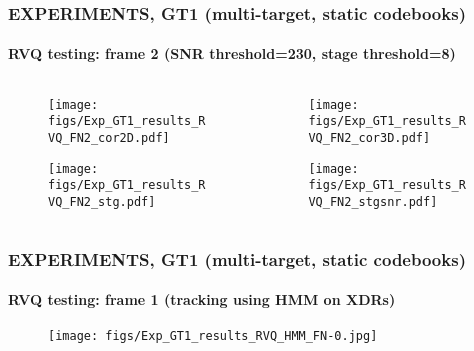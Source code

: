 \begin{frame}
\frametitle{\small EXPERIMENTS, GT1 (multi-target, static codebooks)}
\framesubtitle{RVQ testing: frame 2 (SNR threshold=230, stage threshold=8)}
	\begin{changemargin}{-1.35in}{0in}
	\begin{columns}
		\begin{column}{1.5in}
			\begin{figure}
				\texttt{[image: figs/Exp\_GT1\_results\_RVQ\_FN2\_cor2D.pdf]}
			\end{figure}			
			\begin{figure}
				\texttt{[image: figs/Exp\_GT1\_results\_RVQ\_FN2\_stg.pdf]}
			\end{figure}
		\end{column}
		\begin{column}{1.5in}
			\begin{figure}
				\texttt{[image: figs/Exp\_GT1\_results\_RVQ\_FN2\_cor3D.pdf]}
			\end{figure}
			\begin{figure}
				\texttt{[image: figs/Exp\_GT1\_results\_RVQ\_FN2\_stgsnr.pdf]}
			\end{figure}
		\end{column}
	\end{columns}
	\end{changemargin}
\end{frame}



\begin{frame}
\frametitle{\small EXPERIMENTS, GT1 (multi-target, static codebooks)}
\framesubtitle{RVQ testing: frame 1 (tracking using HMM on XDRs)}
\mypagenum
	\begin{figure}
		\texttt{[image: figs/Exp\_GT1\_results\_RVQ\_HMM\_FN-0.jpg]}
	\end{figure}
\end{frame}





